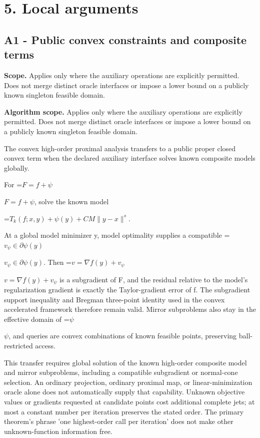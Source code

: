 \documentclass[10pt,a4paper]{article}
\newcommand{\AtlasMath}[1]{\par\begingroup\centering\setbox0=\hbox{$\displaystyle #1$}\ifdim\wd0>1.4\linewidth\typeout{ATLAS WIDE FORMULA: \the\wd0}\fi\ifdim\wd0>\linewidth\resizebox{\linewidth}{!}{\box0}\else\box0\fi\par\endgroup}
\newcommand{\AtlasInlineMath}[1]{\begingroup\setbox0=\hbox{$#1$}\ifdim\wd0>.4\linewidth\endgroup\AtlasMath{#1}\else\endgroup$#1$\fi}
\begin{document}
\section{5. Local arguments}
\subsection{A1 - Public convex constraints and composite terms}
\textbf{Scope.} Applies only where the auxiliary operations are explicitly permitted. Does not merge distinct oracle interfaces or impose a lower bound on a publicly known singleton feasible domain.

\textbf{Algorithm scope.} Applies only where the auxiliary operations are explicitly permitted. Does not merge distinct oracle interfaces or impose a lower bound on a publicly known singleton feasible domain.

The convex high-order proximal analysis transfers to a public proper closed convex term when the declared auxiliary interface solves known composite models globally.

For \AtlasInlineMath{F=f+\psi}, solve the known model

\AtlasMath{T_k(f;x,y)+\psi(y)+CM\|y-x\|^s.}

At a global model minimizer y, model optimality supplies a compatible \AtlasInlineMath{v_\psi\in\partial\psi(y)}. Then \AtlasInlineMath{v=\nabla f(y)+v_\psi} is a subgradient of F, and the residual relative to the model's regularization gradient is exactly the Taylor-gradient error of f. The subgradient support inequality and Bregman three-point identity used in the convex accelerated framework therefore remain valid. Mirror subproblems also stay in the effective domain of \AtlasInlineMath{\psi}, and queries are convex combinations of known feasible points, preserving ball-restricted access.

This transfer requires global solution of the known high-order composite model and mirror subproblems, including a compatible subgradient or normal-cone selection. An ordinary projection, ordinary proximal map, or linear-minimization oracle alone does not automatically supply that capability. Unknown objective values or gradients requested at candidate points cost additional complete jets; at most a constant number per iteration preserves the stated order. The primary theorem's phrase 'one highest-order call per iteration' does not make other unknown-function information free.
\end{document}
